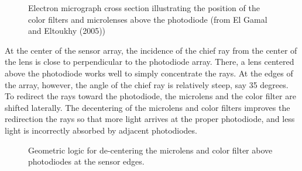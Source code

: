 \documentclass[
  letterpaper,
]{book}
\begin{document}
\begin{figure}


\caption{\label{fig-components-microlens}Electron micrograph cross
section illustrating the position of the color filters and microlenses
above the photodiode (from El Gamal and Eltoukhy (2005))}

\end{figure}%

At the center of the sensor array, the incidence of the chief ray from
the center of the lens is close to perpendicular to the photodiode
array. There, a lens centered above the photodiode works well to simply
concentrate the rays. At the edges of the array, however, the angle of
the chief ray is relatively steep, say 35 degrees. To redirect the rays
toward the photodiode, the microlens and the color filter are shifted
laterally. The decentering of the microlens and color filters improves
the redirection the rays so that more light arrives at the proper
photodiode, and less light is incorrectly absorbed by adjacent
photodiodes.

\begin{figure}


\caption{\label{fig-components-shiftedmicrolens}Geometric logic for
de-centering the microlens and color filter above photodiodes at the
sensor edges.}

\end{figure}%
\end{document}
